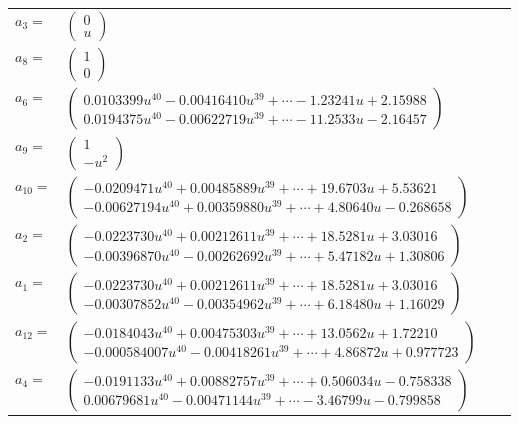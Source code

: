 \documentclass[1p]{elsarticle_modified}
\theoremstyle{definition}
\begin{document}
\begin{tabular}{m{7pt} m{180pt} m{7pt} m{180pt} }
\flushright $a_{3}=$&$\begin{pmatrix}0\\u\end{pmatrix}$ \\
\flushright $a_{8}=$&$\begin{pmatrix}1\\0\end{pmatrix}$ \\
\flushright $a_{6}=$&$\begin{pmatrix}0.0103399 u^{40}-0.00416410 u^{39}+\cdots-1.23241 u+2.15988\\0.0194375 u^{40}-0.00622719 u^{39}+\cdots-11.2533 u-2.16457\end{pmatrix}$ \\
\flushright $a_{9}=$&$\begin{pmatrix}1\\- u^2\end{pmatrix}$ \\
\flushright $a_{10}=$&$\begin{pmatrix}-0.0209471 u^{40}+0.00485889 u^{39}+\cdots+19.6703 u+5.53621\\-0.00627194 u^{40}+0.00359880 u^{39}+\cdots+4.80640 u-0.268658\end{pmatrix}$ \\
\flushright $a_{2}=$&$\begin{pmatrix}-0.0223730 u^{40}+0.00212611 u^{39}+\cdots+18.5281 u+3.03016\\-0.00396870 u^{40}-0.00262692 u^{39}+\cdots+5.47182 u+1.30806\end{pmatrix}$ \\
\flushright $a_{1}=$&$\begin{pmatrix}-0.0223730 u^{40}+0.00212611 u^{39}+\cdots+18.5281 u+3.03016\\-0.00307852 u^{40}-0.00354962 u^{39}+\cdots+6.18480 u+1.16029\end{pmatrix}$ \\
\flushright $a_{12}=$&$\begin{pmatrix}-0.0184043 u^{40}+0.00475303 u^{39}+\cdots+13.0562 u+1.72210\\-0.000584007 u^{40}-0.00418261 u^{39}+\cdots+4.86872 u+0.977723\end{pmatrix}$ \\
\flushright $a_{4}=$&$\begin{pmatrix}-0.0191133 u^{40}+0.00882757 u^{39}+\cdots+0.506034 u-0.758338\\0.00679681 u^{40}-0.00471144 u^{39}+\cdots-3.46799 u-0.799858\end{pmatrix}$ \\

\end{tabular}
\end{document}
